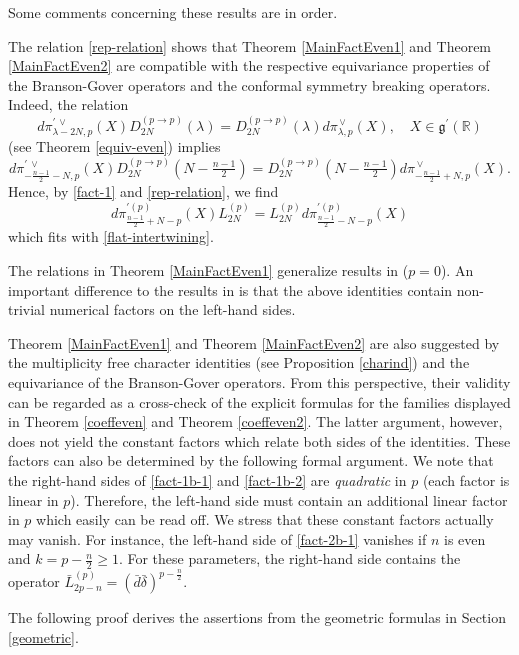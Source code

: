 \documentclass[a4paper,12pt,reqno]{amsart}
\numberwithin{theorem}{subsection}
\numberwithin{equation}{section}
\begin{document}
Some comments concerning these results are in order.

The relation \eqref{rep-relation} shows that Theorem \ref{MainFactEven1} and
Theorem \ref{MainFactEven2} are compatible with the respective equivariance
properties of the Branson-Gover operators and the conformal symmetry breaking
operators. Indeed, the relation
$$
   {d}\pi^{\prime {{\,\vee}}}_{\lambda-2N,p}(X) D_{2N}^{(p \to p)}(\lambda)
   = D_{2N}^{(p \to p)}(\lambda) {d}\pi^{{\,\vee}}_{\lambda,p}(X), \quad  X \in {{\mathfrak g}}^{\prime}({\mathbb{R}})
$$
(see Theorem \ref{equiv-even}) implies
$$
   {d}\pi^{\prime {{\,\vee}}}_{-\frac{n-1}{2}-N,p}(X) D_{2N}^{(p \to p)} (N-\tfrac{n-1}{2})
   = D_{2N}^{(p \to p)}(N-\tfrac{n-1}{2}) {d}\pi^{{\,\vee}}_{-\frac{n-1}{2}+N,p}(X).
$$
Hence, by \eqref{fact-1} and \eqref{rep-relation}, we find
$$
   {d}\pi^{\prime(p)}_{\frac{n-1}{2}+N-p}(X) L_{2N}^{(p)} = L_{2N}^{(p)}
   {d}\pi^{\prime(p)}_{\frac{n-1}{2}-N-p}(X)
$$
which fits with \eqref{flat-intertwining}.

The relations in Theorem \ref{MainFactEven1} generalize results in \cite{Juhl}
($p=0$). An important difference to the results in \cite{Juhl} is that the
above identities contain non-trivial numerical factors on the left-hand sides.

Theorem \ref{MainFactEven1} and Theorem \ref{MainFactEven2} are also suggested
by the multiplicity free character identities (see Proposition \ref{charind})
and the equivariance of the Branson-Gover operators. From this perspective,
their validity can be regarded as a cross-check of the explicit formulas for
the families displayed in Theorem \ref{coeffeven} and Theorem \ref{coeffeven2}.
The latter argument, however, does not yield the constant factors which relate
both sides of the identities. These factors can also be determined by the
following formal argument. We note that the right-hand sides of
\eqref{fact-1b-1} and \eqref{fact-1b-2} are {\em quadratic} in $p$ (each factor
is linear in $p$). Therefore, the left-hand side must contain an additional
linear factor in $p$ which easily can be read off. We stress that these
constant factors actually may vanish. For instance, the left-hand side of
\eqref{fact-2b-1} vanishes if $n$ is even and $k=p-\frac{n}{2} \ge 1$. For
these parameters, the right-hand side contains the operator
$\bar{L}^{(p)}_{2p-n} = (\bar{d}\bar{\delta})^{p-\frac{n}{2}}$.

The following proof derives the assertions from the geometric formulas in
Section \ref{geometric}.
\end{document}
